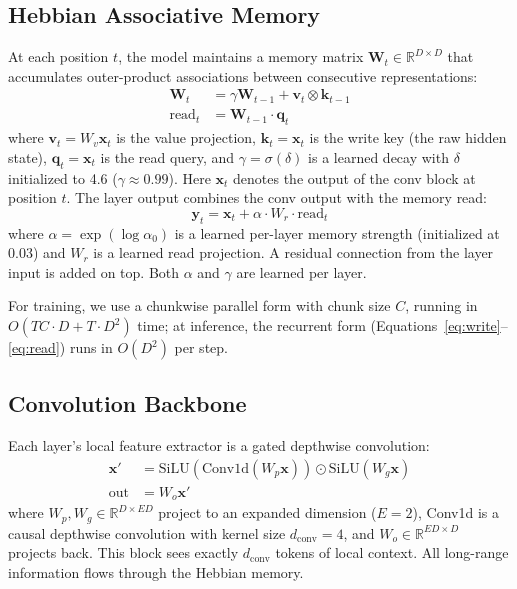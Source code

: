 \documentclass{article}
\newcommand{\vk}{\mathbf{k}}
\newcommand{\vv}{\mathbf{v}}
\newcommand{\vq}{\mathbf{q}}
\newcommand{\vx}{\mathbf{x}}
\newcommand{\vy}{\mathbf{y}}
\newcommand{\mW}{\mathbf{W}}
\begin{document}
\FloatBarrier

\subsection{Hebbian Associative Memory}

At each position $t$, the model maintains a memory matrix $\mW_t \in \mathbb{R}^{D \times D}$ that accumulates outer-product associations between consecutive representations:
\begin{align}
    \mW_t &= \gamma \mW_{t-1} + \vv_t \otimes \vk_{t-1} \label{eq:write} \\
    \text{read}_t &= \mW_{t-1} \cdot \vq_t \label{eq:read}
\end{align}
where $\vv_t = W_v \vx_t$ is the value projection, $\vk_t = \vx_t$ is the write key (the raw hidden state), $\vq_t = \vx_t$ is the read query, and $\gamma = \sigma(\delta)$ is a learned decay with $\delta$ initialized to 4.6 ($\gamma \approx 0.99$). Here $\vx_t$ denotes the output of the conv block at position $t$. The layer output combines the conv output with the memory read:
\begin{equation}
    \vy_t = \vx_t + \alpha \cdot W_r \cdot \text{read}_t
\end{equation}
where $\alpha = \exp(\log \alpha_0)$ is a learned per-layer memory strength (initialized at 0.03) and $W_r$ is a learned read projection. A residual connection from the layer input is added on top. Both $\alpha$ and $\gamma$ are learned per layer.

For training, we use a chunkwise parallel form with chunk size $C$, running in $O(TC \cdot D + T \cdot D^2)$ time; at inference, the recurrent form (Equations~\ref{eq:write}--\ref{eq:read}) runs in $O(D^2)$ per step.

\subsection{Convolution Backbone}

Each layer's local feature extractor is a gated depthwise convolution:
\begin{align}
    \vx' &= \text{SiLU}(\text{Conv1d}(W_p \vx)) \odot \text{SiLU}(W_g \vx) \\
    \text{out} &= W_o \vx'
\end{align}
where $W_p, W_g \in \mathbb{R}^{D \times ED}$ project to an expanded dimension ($E{=}2$), Conv1d is a causal depthwise convolution with kernel size $d_\text{conv}{=}4$, and $W_o \in \mathbb{R}^{ED \times D}$ projects back. This block sees exactly $d_\text{conv}$ tokens of local context. All long-range information flows through the Hebbian memory.
\end{document}
